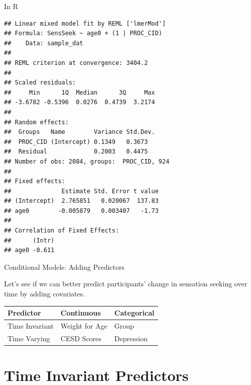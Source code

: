 \begin{frame}[fragile]{In R}

\small

\begin{Shaded}
\begin{Highlighting}[]
\StringTok{ }\OperatorTok{~}\StringTok{ }\OperatorTok{+}\StringTok{ }\NormalTok{(}\OperatorTok{|}
\end{Highlighting}
\end{Shaded}

\centering
\tiny

\begin{verbatim}
## Linear mixed model fit by REML ['lmerMod']
## Formula: SensSeek ~ age0 + (1 | PROC_CID)
##    Data: sample_dat
## 
## REML criterion at convergence: 3404.2
## 
## Scaled residuals: 
##     Min      1Q  Median      3Q     Max 
## -3.6782 -0.5396  0.0276  0.4739  3.2174 
## 
## Random effects:
##  Groups   Name        Variance Std.Dev.
##  PROC_CID (Intercept) 0.1349   0.3673  
##  Residual             0.2003   0.4475  
## Number of obs: 2084, groups:  PROC_CID, 924
## 
## Fixed effects:
##              Estimate Std. Error t value
## (Intercept)  2.765851   0.020067  137.83
## age0        -0.005879   0.003407   -1.73
## 
## Correlation of Fixed Effects:
##      (Intr)
## age0 -0.611
\end{verbatim}

\normalsize
\raggedleft

\end{frame}

\begin{frame}{Conditional Models: Adding Predictors}

Let's see if we can better predict participants' change in sensation
seeking over time by adding covariates.

\begin{longtable}[]{@{}lll@{}}
\toprule
Predictor & Continuous & Categorical\tabularnewline
\midrule
\endhead
Time Invariant & Weight for Age & Group\tabularnewline
Time Varying & CESD Scores & Depression\tabularnewline
\bottomrule
\end{longtable}

\end{frame}

\section{Time Invariant Predictors}\label{time-invariant-predictors}

